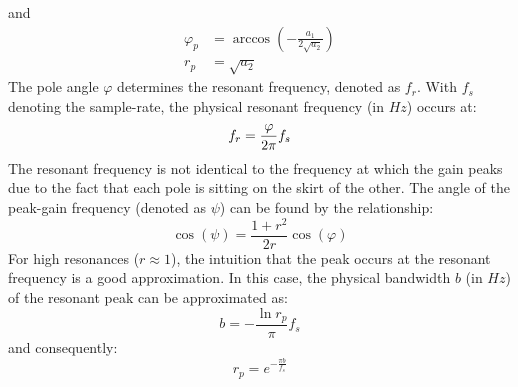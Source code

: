 and
\begin{equation}
\begin{aligned}
 \varphi_p &= \arccos \left( -\frac{a_1}{2 \sqrt{a_2}} \right) \\
 r_p       &= \sqrt{a_2}
\end{aligned}  
\end{equation}
The pole angle $\varphi$ determines the resonant frequency, denoted as $f_r$. With $f_s$ denoting the sample-rate, the physical resonant frequency (in $Hz$) occurs at:
\begin{equation}
 f_r = \frac{\varphi} {2 \pi} f_s \\
\end{equation}
The resonant frequency is not identical to the frequency at which the gain peaks due to the fact that each pole is sitting on the skirt of the other. The angle of the peak-gain frequency (denoted as $\psi$) can be found by the relationship:
\begin{equation}
 \cos(\psi) = \frac{1+r^2}{2r} \cos(\varphi)
\end{equation}
For high resonances ($r \approx 1$), the intuition that the peak occurs at the resonant frequency is a good approximation. In this case, the physical bandwidth $b$ (in $Hz$) of the resonant peak can be approximated as:
\begin{equation}
 b = - \frac{\ln r_p}{\pi} f_s
\end{equation}
and consequently:
\begin{equation}
 r_p = e^{-\frac{\pi b}{f_s}}
\end{equation}

